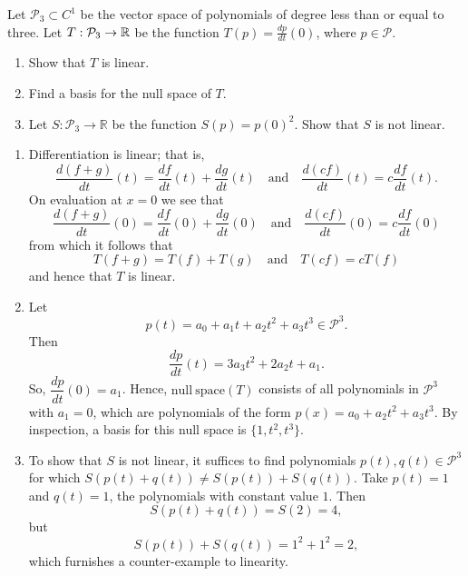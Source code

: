 \documentclass{ximera}
\author{Matthew Carr \& Marty Golubitsky}
\begin{document}
\begin{exercise}\label{mc.exerciseErr1}

Let $\mathcal{P}_3\subset C^1$ be the vector space of polynomials of degree less than or equal to three.  Let $T:\mathcal{P}_3\to \mbox{$\mathbb{R}$}$ be the function $T(p) = \frac{dp}{dt}(0)$, where $p\in\mathcal{P}$.
\begin{enumerate}[label=(\alph*)]
\item Show that $T$ is linear.
\item  Find a basis for the null space of $T$.
\item Let  $S:\mathcal{P}_3\rightarrow \mathbb{R}$ be the function $S(p)=p(0)^2$.  Show that $S$ is not linear.
\end{enumerate}

  
\begin{solution}

\soln  
\begin{enumerate}[label=(\alph*)]
\item Differentiation is linear; that is, 
\[
\dfrac{d(f+g)}{dt}(t) = \dfrac{df}{dt}(t)+\dfrac{dg}{dt}(t) \quad \mbox{and} \quad 
\dfrac{d(cf)}{dt}(t) = c\dfrac{df}{dt}(t).
\]
On evaluation at $x=0$ we see that 
\[
\dfrac{d(f+g)}{dt}(0) = \dfrac{df}{dt}(0)+\dfrac{dg}{dt}(0) \quad \mbox{and} \quad 
\dfrac{d(cf)}{dt}(0) = c\dfrac{df}{dt}(0)
\]
from which it follows that
\[
T(f+g) = T(f) + T(g)  \quad \mbox{and} \quad  T(cf) = cT(f)
\]
and hence that $T$ is linear.
\item Let 
\[
p(t)=a_0+a_1t+a_2 t^2+a_3 t^3 \in \mathcal{P}^3.
\]
Then
 \[
 \dfrac{dp}{dt}(t)=3a_3t^2+2a_2 t+a_1.
 \]
So, $\dfrac{dp}{dt}(0)=a_1$. Hence, $\mathrm{null\ space}(T)$ consists of all polynomials in $\mathcal{P}^3$ with $a_1=0$, which are polynomials of the form $p(x)=a_0+a_2 t^2+a_3 t^3$. By inspection, a basis for this null space is $\{1,t^2,t^3\}$.
\item To show that $S$ is not linear, it suffices to find polynomials $p(t),q(t)\in\mathcal{P}^3$ for which $S(p(t)+q(t))\ne S(p(t))+S(q(t))$. Take $p(t)=1$ and $q(t)=1$, the polynomials with constant value $1$.  Then 
\[
S(p(t)+q(t)) = S(2) =4,
\]
but
\[
S(p(t))+S(q(t)) = 1^2+1^2 = 2,
\]
which furnishes a counter-example to linearity.
\end{enumerate}
\end{solution}
\end{exercise}
\end{document}

